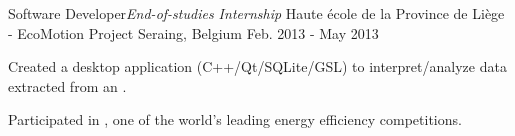 \begin{cventries}
  \cventry
    {Software Developer{\enskip\cdotp\enskip}\it{End-of-studies Internship}} %
    {Haute école de la Province de Liège - EcoMotion Project} %
    {Seraing, Belgium} %
    {Feb. 2013 - May 2013} %
    {
      \begin{cvitems} %
        \item{Created a desktop application (C++/Qt/SQLite/GSL) to interpret/analyze data extracted from an .}
        \item{Participated in , one of the world's leading energy efficiency competitions.}
      \end{cvitems}
    }

\end{cventries}


